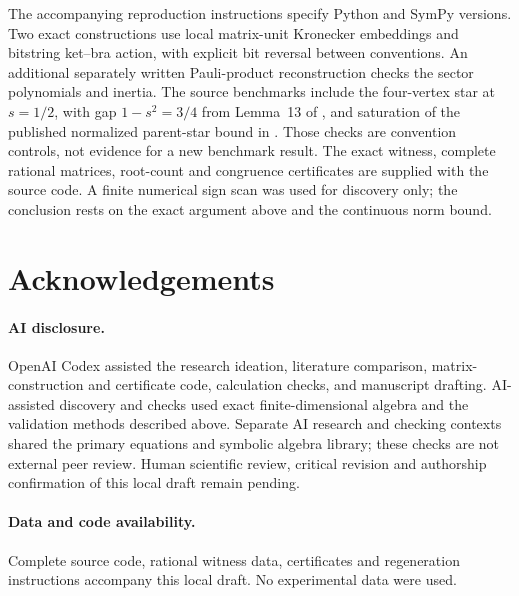 \documentclass[11pt]{article}
\begin{document}
The accompanying reproduction instructions specify Python and SymPy versions. Two exact constructions use local matrix-unit Kronecker embeddings and bitstring ket--bra action, with explicit bit reversal between conventions. An additional separately written Pauli-product reconstruction checks the sector polynomials and inertia. The source benchmarks include the four-vertex star at $s=1/2$, with gap $1-s^2=3/4$ from Lemma~13 of \cite{Wong2026}, and saturation of the published normalized parent-star bound in \cite{Ju2025}. Those checks are convention controls, not evidence for a new benchmark result. The exact witness, complete rational matrices, root-count and congruence certificates are supplied with the source code. A finite numerical sign scan was used for discovery only; the conclusion rests on the exact argument above and the continuous norm bound.

\section*{Acknowledgements}
\paragraph{AI disclosure.} OpenAI Codex assisted the research ideation, literature comparison, matrix-construction and certificate code, calculation checks, and manuscript drafting. AI-assisted discovery and checks used exact finite-dimensional algebra and the validation methods described above. Separate AI research and checking contexts shared the primary equations and symbolic algebra library; these checks are not external peer review. Human scientific review, critical revision and authorship confirmation of this local draft remain pending.

\paragraph{Data and code availability.} Complete source code, rational witness data, certificates and regeneration instructions accompany this local draft. No experimental data were used.


\end{document}
